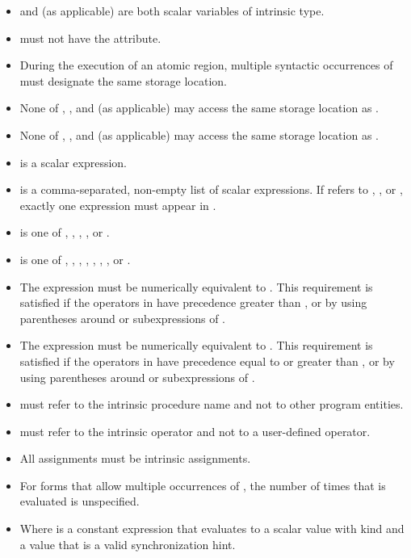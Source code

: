 \begin{fortranspecific}
\begin{itemize}
\item {} and  (as applicable) are both scalar variables of intrinsic type.
\item {} must not have the  attribute.
\item During the execution of an atomic region, multiple syntactic occurrences 
      of  must designate the same storage location.
\item None of , , and  (as applicable) may access 
      the same storage location as .
\item None of , , and  (as applicable) may access 
      the same storage location as .
\item {} is a scalar expression.
\item {} is a comma-separated, non-empty list of scalar expressions. 
      If  refers to , , or 
      , exactly one expression must appear in .
\item {} is one of , , 
      , , or .
\item {} is one of \code{+}, \code{*}, \code{-}, \code{/}, 
      , , , or .
\item The expression  must be numerically equivalent to 
      . This requirement is satisfied if the operators 
      in  have precedence greater than , or by using 
      parentheses around  or subexpressions of .
\item The expression  must be numerically equivalent to 
      . This requirement is satisfied if the operators 
      in  have precedence equal to or greater than , or 
      by using parentheses around  or subexpressions of .
\item {} must refer to the intrinsic procedure name 
      and not to other program entities.
\item {} must refer to the intrinsic operator and not to a 
      user-defined operator.
\item All assignments must be intrinsic assignments.
\item For forms that allow multiple occurrences of , the number of times 
      that  is evaluated is unspecified.
\item Where  is a constant expression that evaluates to a 
      scalar value with kind  and a value that is a 
      valid synchronization hint.
\end{itemize}
\end{fortranspecific}

